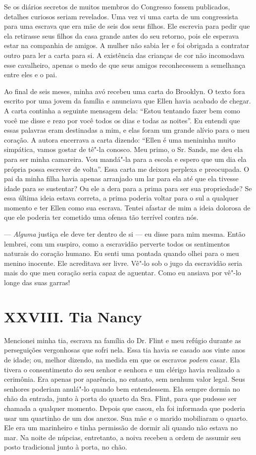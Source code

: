 Se os diários secretos de muitos
membros do Congresso fossem publicados, detalhes curiosos seriam
revelados. Uma vez vi uma carta de um congressista para uma escrava que
era mãe de seis dos seus filhos. Ele escrevia para pedir que ela
retirasse seus filhos da casa grande antes do seu retorno, pois ele
esperava estar na companhia de amigos. A mulher não sabia ler e foi
obrigada a contratar outro para ler a carta para si. A existência das
crianças de cor não incomodava esse cavalheiro, apenas o medo de que
seus amigos reconhecessem a semelhança entre eles e o pai.

Ao final de seis meses, minha avó
recebeu uma carta do Brooklyn. O texto fora escrito por uma jovem da
família e anunciava que Ellen havia acabado de chegar. A carta continha
a seguinte mensagem dela: ``Estou tentando fazer bem como você me disse
e rezo por você todos os dias e todas as noites''. Eu entendi que essas
palavras eram destinadas a mim, e elas foram um grande alívio para o meu
coração. A autora encerrava a carta dizendo: ``Ellen é uma menininha
muito simpática, vamos gostar de tê"-la conosco. Meu primo, o Sr. Sands,
me deu ela para ser minha camareira. Vou mandá"-la para a escola e espero
que um dia ela própria possa escrever de volta''. Essa carta me deixou
perplexa e preocupada. O pai da minha filha havia apenas arranjado um
lar para ela até que ela tivesse idade para se sustentar? Ou ele a dera
para a prima para ser sua propriedade? Se essa última ideia estava
correta, a prima poderia voltar para o sul a qualquer momento e ter
Ellen como sua escrava. Tentei afastar de mim a ideia dolorosa de que
ele poderia ter cometido uma ofensa tão terrível contra nós.

--- \emph{Alguma} justiça ele deve ter dentro de si --- eu disse para
mim mesma. Então lembrei, com um suspiro, como a escravidão perverte
todos os sentimentos naturais do coração humano. Eu senti uma pontada
quando olhei para o meu menino inocente. Ele acreditava ser livre. Vê"-lo
sob o jugo da escravidão seria mais do que meu coração seria capaz de
aguentar. Como eu ansiava por vê"-lo longe das suas garras!

\chapter{XXVIII. Tia Nancy}

Mencionei minha tia, escrava na família do Dr. Flint e meu refúgio
durante as perseguições vergonhosas que sofri nela. Essa tia havia se
casado aos vinte anos de idade; ou, melhor dizendo, na medida em que os
escravos \emph{podem} casar. Ela tivera o consentimento do seu senhor e
senhora e um clérigo havia realizado a cerimônia. Era apenas por
aparência, no entanto, sem nenhum valor legal. Seus senhores poderiam
anulá"-lo quando bem entendessem. Ela sempre dormia no chão da entrada,
junto à porta do quarto da Sra. Flint, para que pudesse ser chamada a
qualquer momento. Depois que casou, ela foi informada que poderia usar
um quartinho de um dos anexos. Sua mãe e o marido mobiliaram o quarto.
Ele era um marinheiro e tinha permissão de dormir ali quando não estava
no mar. Na noite de núpcias, entretanto, a noiva recebeu a ordem de
assumir seu posto tradicional junto à porta, no chão.

